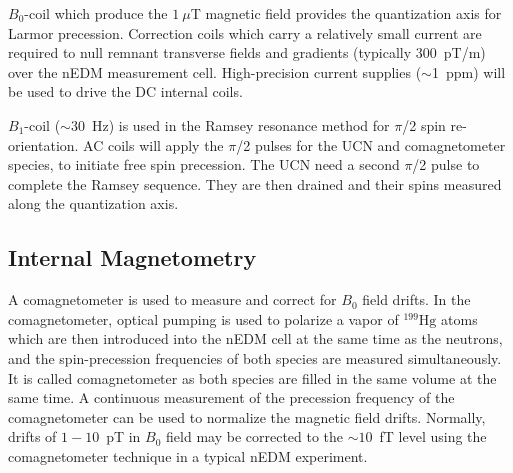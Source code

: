 
$B_0$-coil which produce the $1~\mu$T magnetic field provides the quantization axis for Larmor precession. Correction coils which carry a relatively small current are required to null remnant transverse fields and gradients (typically $300$~pT/m) over the nEDM measurement cell. High-precision current supplies ($\sim$1~ppm) will be used to drive the DC internal coils. 






$B_1$-coil ($\sim$30~Hz) is used in the Ramsey resonance method for $\pi$/2 spin re-orientation. AC coils will apply the $\pi$/2 pulses for the UCN and comagnetometer species, to initiate free spin precession. The UCN need a second $\pi$/2 pulse to complete the Ramsey sequence. They are then drained and their spins measured along the quantization axis.

\subsection{Internal Magnetometry}

A comagnetometer is used to measure and correct for  $B_0$ field drifts. 
In the comagnetometer, optical pumping is used to polarize a vapor of $^{199}\mathrm{Hg}$ atoms which are then introduced into the nEDM cell at the same time as the neutrons, and the spin-precession frequencies of both species are measured simultaneously. It is called comagnetometer as both species are filled in the same volume at the same time. A continuous measurement of the precession frequency of the comagnetometer can be used to normalize the magnetic field drifts. Normally, drifts of $1-10$~pT in $B_0$ field may be corrected to the $\sim10$~fT level using the comagnetometer technique in a typical nEDM experiment. 


